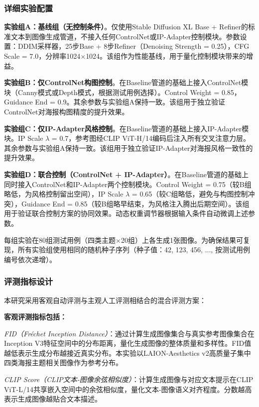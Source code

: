 \documentclass[12pt,a4paper]{ctexart}
\newcommand{\sdxl}{Stable Diffusion XL}
\newcommand{\controlnet}{ControlNet}
\newcommand{\ipadapter}{IP-Adapter}
\begin{document}
\subsubsection{详细实验配置}

\textbf{实验组A：基线组（无控制条件）}。仅使用\sdxl{} Base + Refiner的标准文本到图像生成管道，不接入任何\controlnet{}或\ipadapter{}控制模块。参数设置：DDIM采样器，25步Base + 8步Refiner（Denoising Strength = 0.25），CFG Scale = 7.0，分辨率1024$\times$1024。该组作为性能基线，用于量化控制模块带来的增益。

\textbf{实验组B：仅ControlNet构图控制}。在Baseline管道的基础上接入\controlnet{}模块（Canny模式或Depth模式，根据测试用例选择）。Control Weight = 0.85，Guidance End = 0.9。其余参数与实验组A保持一致。该组用于独立验证\controlnet{}对海报构图精度的提升效果。

\textbf{实验组C：仅IP-Adapter风格控制}。在Baseline管道的基础上接入\ipadapter{}模块。IP Scale $\lambda$ = 0.7，参考图经CLIP ViT-H/14编码后注入所有交叉注意力层。其余参数与实验组A保持一致。该组用于独立验证\ipadapter{}对海报风格一致性的提升效果。

\textbf{实验组D：联合控制（ControlNet + IP-Adapter）}。在Baseline管道的基础上同时接入\controlnet{}和\ipadapter{}两个控制模块。Control Weight = 0.75（较B组略低，为风格控制留出空间），IP Scale $\lambda$ = 0.65（较C组略低，避免与构图控制冲突），Guidance End = 0.85（较B组略早结束，为风格注入腾出后期空间）。该组用于验证联合控制方案的协同效果。动态权重调节器根据输入条件自动微调上述参数。

每组实验在80组测试用例（四类主题$\times$20组）上各生成1张图像。为确保结果可复现，所有实验组使用相同的随机种子序列（种子值：42, 123, 456, ..., 按测试用例编号依次递增）。

\subsubsection{评测指标设计}

本研究采用客观自动评测与主观人工评测相结合的混合评测方案：

\textbf{客观评测指标包括：}

\textit{FID（Fréchet Inception Distance）}：通过计算生成图像集合与真实参考图像集合在Inception V3特征空间中的分布距离，量化生成图像的整体质量和多样性。FID值越低表示生成分布越接近真实分布。本实验以LAION-Aesthetics v2高质量子集中四类海报主题相关图像作为参考分布。

\textit{CLIP Score（CLIP文本-图像余弦相似度）}：计算生成图像与对应文本提示在CLIP ViT-L/14共享嵌入空间中的余弦相似度，量化文本-图像语义对齐程度。分数越高表示生成图像越贴合文本描述。
\end{document}
